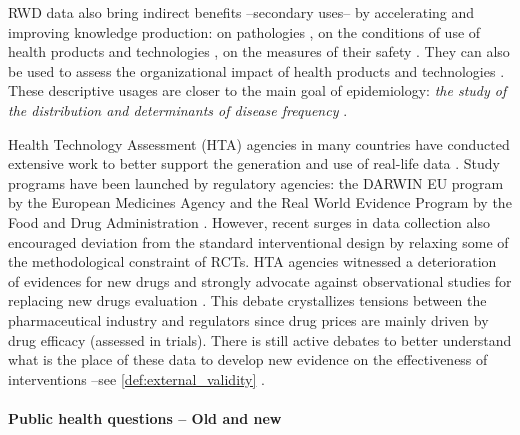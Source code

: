 \documentclass[french,12pt,twoside,a4paper]{book}
\begin{document}
RWD data also bring indirect benefits --secondary uses-- by accelerating and
improving knowledge production: on pathologies
\citep{campbell_characterizing_2022}, on the conditions of use of health
products and technologies \citep{safran_toward_2007,tuppin_value_2017}, on the
measures of their safety \citep{wisniewski_development_2003}. They can also be
used to assess the organizational impact of health products and technologies
\citep{has_guide_2020,has_real-world_2021}. These descriptive usages are closer
to the main goal of epidemiology: \textit{the study of the distribution
  and determinants of disease frequency} \citep{macmahon1970epidemiology}.

Health Technology Assessment (HTA) agencies in many countries have conducted
extensive work to better support the generation and use of real-life data
\citep{fda_real-world_2021,has_real-world_2021,kent_nice_2022,plamondongenevieve_integration_2022}.
Study programs have been launched by regulatory agencies: the DARWIN EU program
by the European Medicines Agency and the Real World Evidence Program by the Food
and Drug Administration \citep{fda_real_2018}. However, recent surges in data
collection also encouraged deviation from the standard interventional design by
relaxing some of the methodological constraint of RCTs. HTA agencies witnessed a
deterioration of evidences for new drugs and strongly advocate against
observational studies for replacing new drugs evaluation
\citep{wieseler2023replacing,vanier2023rapid}. This debate crystallizes tensions
between the pharmaceutical industry and regulators since drug prices are
mainly driven by drug efficacy (assessed in trials).
%
There is still active debates to better understand what is the place of these
data to develop new evidence on the effectiveness of interventions --see
\ref{def:external_validity} \citep{richesson_electronic_2013,wang2023emulation}.

\paragraph{Public health questions -- Old and new}
\end{document}
